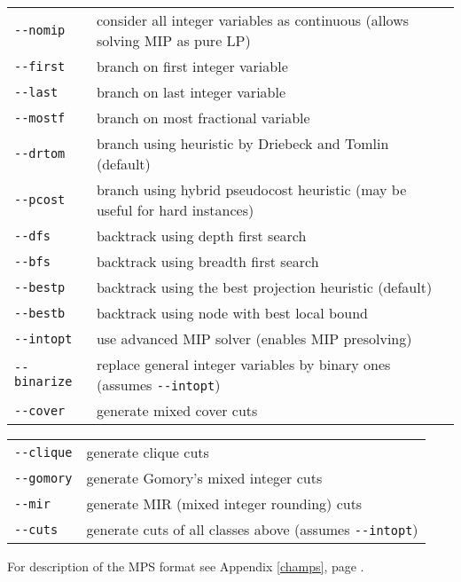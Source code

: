 \noindent
\begin{tabular}{@{}p{30mm}p{92.3mm}@{}}
\verb|--nomip|    &  consider all integer variables as continuous
                     (allows solving MIP as pure LP) \\
\verb|--first|    &  branch on first integer variable \\
\verb|--last|     &  branch on last integer variable \\
\verb|--mostf|    &  branch on most fractional variable \\
\verb|--drtom|    &  branch using heuristic by Driebeck and Tomlin
                     (default) \\
\verb|--pcost|    &  branch using hybrid pseudocost heuristic (may be
                     useful for hard instances) \\
\verb|--dfs|      &  backtrack using depth first search \\
\verb|--bfs|      &  backtrack using breadth first search \\
\verb|--bestp|    &  backtrack using the best projection heuristic
                     (default) \\
\verb|--bestb|    &  backtrack using node with best local bound \\
\verb|--intopt|   &  use advanced MIP solver (enables MIP presolving)\\
\verb|--binarize| &  replace general integer variables by binary ones
                     (assumes \verb|--intopt|)\\
\verb|--cover|    &  generate mixed cover cuts\\
\end{tabular}

\noindent
\begin{tabular}{@{}p{30mm}p{92.3mm}@{}}
\verb|--clique|   &  generate clique cuts\\
\verb|--gomory|   &  generate Gomory's mixed integer cuts\\
\verb|--mir|      &  generate MIR (mixed integer rounding) cuts\\
\verb|--cuts|     &  generate cuts of all classes above (assumes
                     \verb|--intopt|)\\
\end{tabular}

\bigskip

\noindent
For description of the MPS format see Appendix \ref{champs},
page \pageref{champs}.

\bigskip

